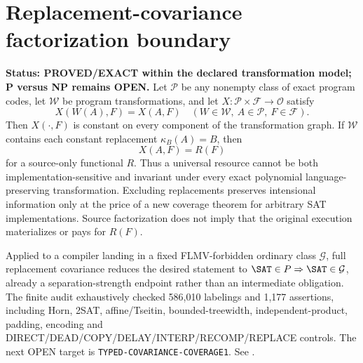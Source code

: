 \section{Replacement-covariance factorization boundary}
\textbf{Status: PROVED/EXACT within the declared transformation model; P versus NP remains OPEN.}
Let \(\mathcal P\) be any nonempty class of exact program codes, let
\(\mathcal W\) be program transformations, and let
\(X:\mathcal P\times\mathcal F\to\mathcal O\) satisfy
\[
 X(W(A),F)=X(A,F)
 \quad(W\in\mathcal W,\ A\in\mathcal P,\ F\in\mathcal F).
\]
Then \(X(\cdot,F)\) is constant on every component of the transformation
graph. If \(\mathcal W\) contains each constant replacement
\(\kappa_B(A)=B\), then
\[
 X(A,F)=R(F)
\]
for a source-only functional \(R\). Thus a universal resource cannot be both
implementation-sensitive and invariant under every exact polynomial
language-preserving transformation. Excluding replacements preserves
intensional information only at the price of a new coverage theorem for
arbitrary SAT implementations. Source factorization does not imply that the
original execution materializes or pays for \(R(F)\).

Applied to a compiler landing in a fixed FLMV-forbidden ordinary class
\(\mathcal G\), full replacement covariance reduces the desired statement to
\(\SAT\in P\Rightarrow\SAT\in\mathcal G\), already a
separation-strength endpoint rather than an intermediate obligation. The
finite audit exhaustively checked 586,010 labelings and 1,177 assertions,
including Horn, 2SAT, affine/Tseitin, bounded-treewidth, independent-product,
padding, encoding and DIRECT/DEAD/COPY/DELAY/INTERP/RECOMP/REPLACE controls.
The next OPEN target is \texttt{TYPED-COVARIANCE-COVERAGE1}.
See .

